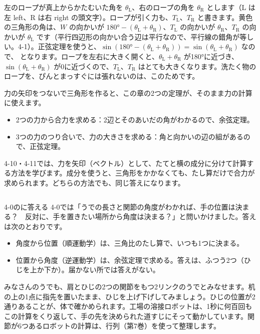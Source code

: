 \par\vspace{4pt}
\noindent 左のロープが真上からかたむいた角を $\theta_{\mathrm{L}}$、右のロープの角を $\theta_{\mathrm{R}}$ とします（L は左 left、R は右 right の頭文字）。ロープが引く力も、$T_{\mathrm{L}}$、$T_{\mathrm{R}}$ と書きます。黄色の三角形の角は、$W$ の向かいが $\ang{180}-(\theta_{\mathrm{L}}+\theta_{\mathrm{R}})$、$T_{\mathrm{L}}$ の向かいが $\theta_{\mathrm{R}}$、$T_{\mathrm{R}}$ の向かいが $\theta_{\mathrm{L}}$ です（平行四辺形の向かい合う辺は平行なので、平行線の錯角が等しい。4-1）。正弦定理を使うと、$\sin(\ang{180}-(\theta_{\mathrm{L}}+\theta_{\mathrm{R}}))=\sin(\theta_{\mathrm{L}}+\theta_{\mathrm{R}})$ なので、
となります。ロープを左右に大きく開くと、$\theta_{\mathrm{L}}+\theta_{\mathrm{R}}$ が\ang{180}に近づき、$\sin(\theta_{\mathrm{L}}+\theta_{\mathrm{R}})$ が0に近づくので、$T_{\mathrm{L}}$、$T_{\mathrm{R}}$ はとても大きくなります。洗たく物のロープを、ぴんとまっすぐには張れないのは、このためです。

力の矢印をつないで三角形を作ると、この章の2つの定理が、そのまま力の計算に使えます。
\begin{itemize}[leftmargin=1.2\zw, itemsep=1pt, topsep=2pt, label={\color{\bkTT}●}]
\item 2つの力から合力を求める：2辺とそのあいだの角がわかるので、余弦定理。
\item 3つの力のつり合いで、力の大きさを求める：角と向かいの辺の組があるので、正弦定理。
\end{itemize}
4-10・4-11では、力を矢印（ベクトル）として、たてと横の成分に分けて計算する方法を学びます。成分を使うと、三角形をかかなくても、たし算だけで合力が求められます。どちらの方法でも、同じ答えになります。

\begin{column}{4-0の\bkhatenaref に答える}
4-0では「うでの長さと関節の角度がわかれば、手の位置は決まる？　反対に、手を置きたい場所から角度は決まる？」と問いかけました。答えは次のとおりです。
\begin{itemize}[leftmargin=1.2\zw, itemsep=1pt, topsep=2pt, label={\color{\bkTT}●}]
\item 角度から位置（順運動学）は、三角比のたし算で、いつも1つに決まる。
\item 位置から角度（逆運動学）は、余弦定理で求める。答えは、ふつう2つ（ひじを上か下か）。届かない所では答えがない。
\end{itemize}
みなさんのうでも、肩とひじの2つの関節をもつ2リンクのうでとみなせます。机の上の1点に指先を置いたまま、ひじを上げ下げしてみましょう。ひじの位置が2通りあることが、体で確かめられます。工場の溶接ロボットは、1秒に何百回もこの計算をくり返して、手の先を決められた道すじにそって動かしています。関節が6つあるロボットの計算は、行列（第7巻）を使って整理します。
\end{column}


